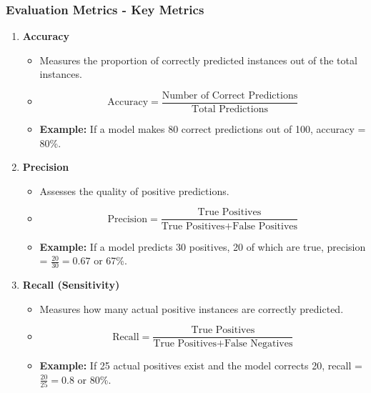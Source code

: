 \documentclass[aspectratio=169]{beamer}
\begin{document}
\begin{frame}[fragile]
    \frametitle{Evaluation Metrics - Key Metrics}
    \begin{enumerate}
        \item \textbf{Accuracy}
            \begin{itemize}
                \item Measures the proportion of correctly predicted instances out of the total instances.
                \item {} 
                \[
                \text{Accuracy} = \frac{\text{Number of Correct Predictions}}{\text{Total Predictions}}
                \]
                \item \textbf{Example:} If a model makes 80 correct predictions out of 100, accuracy = 80\%.
            \end{itemize}
        
        \item \textbf{Precision}
            \begin{itemize}
                \item Assesses the quality of positive predictions.
                \item {}
                \[
                \text{Precision} = \frac{\text{True Positives}}{\text{True Positives} + \text{False Positives}}
                \]
                \item \textbf{Example:} If a model predicts 30 positives, 20 of which are true, precision = \( \frac{20}{30} = 0.67 \) or 67\%.
            \end{itemize}
        
        \item \textbf{Recall (Sensitivity)}
            \begin{itemize}
                \item Measures how many actual positive instances are correctly predicted.
                \item {}
                \[
                \text{Recall} = \frac{\text{True Positives}}{\text{True Positives} + \text{False Negatives}}
                \]
                \item \textbf{Example:} If 25 actual positives exist and the model corrects 20, recall = \( \frac{20}{25} = 0.8 \) or 80\%.
            \end{itemize}
    \end{enumerate}
\end{frame}
\end{document}

